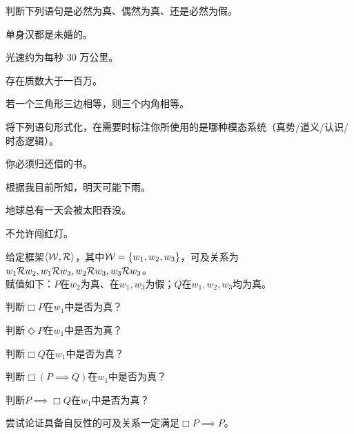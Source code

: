 \documentclass{quiz}
\begin{document}
\begin{questions}

  \question 判断下列语句是必然为真、偶然为真、还是必然为假。
  \begin{parts}
    \item 单身汉都是未婚的。
    \item 光速约为每秒 30 万公里。
    \item 存在质数大于一百万。
    \item 若一个三角形三边相等，则三个内角相等。
  \end{parts}
  \vspace{2.5in}
  
  \question 将下列语句形式化，在需要时标注你所使用的是哪种模态系统（真势/道义/认识/时态逻辑）。
  \begin{parts}
    \item 你必须归还借的书。
    \item 根据我目前所知，明天可能下雨。
    \item 地球总有一天会被太阳吞没。
    \item 不允许闯红灯。
  \end{parts}
  \clearpage
  
  \question 给定框架$\oset{\struct{W}, \struct{R}}$，其中$\mathcal{W} = \set{w_1, w_2, w_3}$，可及关系为$w_1\mathcal{R}w_2, w_1\mathcal{R}w_3, w_2\mathcal{R}w_3, w_3\mathcal{R}w_3$。\\赋值如下：$P$在$w_2$为真、在$w_1, w_3$为假；$Q$在$w_1, w_2, w_3$均为真。
  \begin{parts}
    \item 判断$\Box P$在$w_1$中是否为真？
    \item 判断$\Diamond P$在$w_1$中是否为真？
    \item 判断$\Box Q$在$w_1$中是否为真？
    \item 判断$\Box(P \implies Q)$在$w_1$中是否为真？
    \item 判断$P \implies \Box Q$在$w_1$中是否为真？
  \end{parts}
  \vspace{3.5in}
  
  \question 尝试论证具备自反性的可及关系一定满足$\Box P \implies P$。
  
\end{questions}
\end{document}
